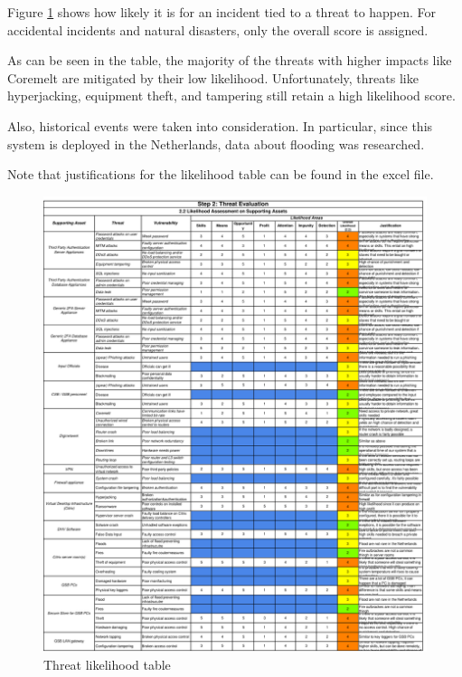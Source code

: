 \newpage

Figure \ref{fig:likelihood} shows how likely it is for an incident tied to a threat to happen. For accidental incidents and natural disasters, only the overall score is assigned.

As can be seen in the table, the majority of the threats with higher impacts like Coremelt are mitigated by their low likelihood. Unfortunately, threats like hyperjacking, equipment theft, and tampering still retain a high likelihood score.

Also, historical events were taken into consideration. In particular, since this system is deployed in the Netherlands, data about flooding was researched\cite{online:flooding}.

Note that justifications for the likelihood table can be found in the excel file.

\begin{figure}[]
    \centering
    \includegraphics[keepaspectratio,width=1\textwidth]{03-risk-analysis/003-TE/img/likelihood.pdf}
    \caption{Threat likelihood table}
    \label{fig:likelihood}
\end{figure}
